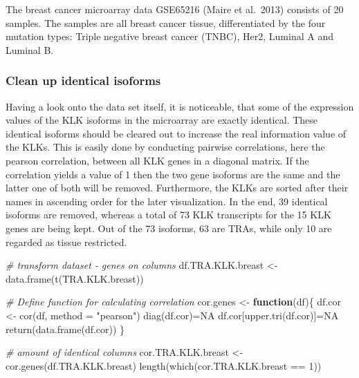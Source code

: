 \documentclass[
]{article}
\newenvironment{Shaded}{\begin{snugshade}}{\end{snugshade}}
\newcommand{\AttributeTok}[1]{\textcolor[rgb]{0.77,0.63,0.00}{#1}}
\newcommand{\CommentTok}[1]{\textcolor[rgb]{0.56,0.35,0.01}{\textit{#1}}}
\newcommand{\ConstantTok}[1]{\textcolor[rgb]{0.00,0.00,0.00}{#1}}
\newcommand{\ControlFlowTok}[1]{\textcolor[rgb]{0.13,0.29,0.53}{\textbf{#1}}}
\newcommand{\DecValTok}[1]{\textcolor[rgb]{0.00,0.00,0.81}{#1}}
\newcommand{\FunctionTok}[1]{\textcolor[rgb]{0.00,0.00,0.00}{#1}}
\newcommand{\NormalTok}[1]{#1}
\newcommand{\OtherTok}[1]{\textcolor[rgb]{0.56,0.35,0.01}{#1}}
\newcommand{\SpecialCharTok}[1]{\textcolor[rgb]{0.00,0.00,0.00}{#1}}
\newcommand{\StringTok}[1]{\textcolor[rgb]{0.31,0.60,0.02}{#1}}
\begin{document}
The breast cancer microarray data GSE65216 (Maire et al.~2013) consists
of 20 samples. The samples are all breast cancer tissue, differentiated
by the four mutation types: Triple negative breast cancer (TNBC), Her2,
Luminal A and Luminal B.

\hypertarget{clean-up-identical-isoforms}{%
\subsubsection{Clean up identical
isoforms}\label{clean-up-identical-isoforms}}

Having a look onto the data set itself, it is noticeable, that some of
the expression values of the KLK isoforms in the microarray are exactly
identical. These identical isoforms should be cleared out to increase
the real information value of the KLKs. This is easily done by
conducting pairwise correlations, here the pearson correlation, between
all KLK genes in a diagonal matrix. If the correlation yields a value of
1 then the two gene isoforms are the same and the latter one of both
will be removed. Furthermore, the KLKs are sorted after their names in
ascending order for the later visualization. In the end, 39 identical
isoforms are removed, whereas a total of 73 KLK transcripts for the 15
KLK genes are being kept. Out of the 73 isoforms, 63 are TRAs, while
only 10 are regarded as tissue restricted.

\begin{Shaded}
\begin{Highlighting}[]
\CommentTok{\# transform dataset {-} genes on columns}
\NormalTok{df.TRA.KLK.breast }\OtherTok{\textless{}{-}} \FunctionTok{data.frame}\NormalTok{(}\FunctionTok{t}\NormalTok{(TRA.KLK.breast))}

\CommentTok{\# Define function for calculating correlation }
\NormalTok{cor.genes }\OtherTok{\textless{}{-}} \ControlFlowTok{function}\NormalTok{(df)\{}
\NormalTok{  df.cor }\OtherTok{\textless{}{-}} \FunctionTok{cor}\NormalTok{(df, }\AttributeTok{method =} \StringTok{"pearson"}\NormalTok{)}
  \FunctionTok{diag}\NormalTok{(df.cor)}\OtherTok{=}\ConstantTok{NA}
\NormalTok{  df.cor[}\FunctionTok{upper.tri}\NormalTok{(df.cor)]}\OtherTok{=}\ConstantTok{NA}
  \FunctionTok{return}\NormalTok{(}\FunctionTok{data.frame}\NormalTok{(df.cor))}
\NormalTok{\}}

\CommentTok{\# amount of identical columns}
\NormalTok{cor.TRA.KLK.breast }\OtherTok{\textless{}{-}} \FunctionTok{cor.genes}\NormalTok{(df.TRA.KLK.breast)}
\FunctionTok{length}\NormalTok{(}\FunctionTok{which}\NormalTok{(cor.TRA.KLK.breast }\SpecialCharTok{==} \DecValTok{1}\NormalTok{))}
\end{Highlighting}
\end{Shaded}
\end{document}
